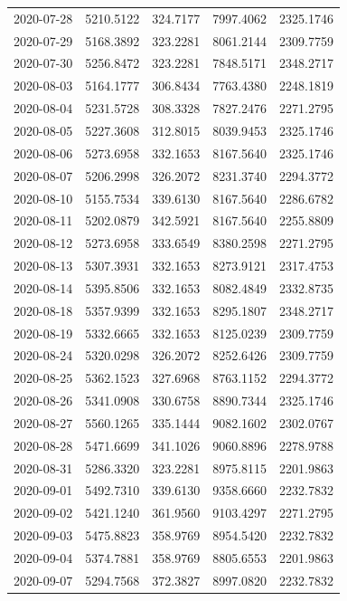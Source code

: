 \begin{footnotesize}
\begin{longtable}{lllll}
2020-07-28 & 5210.5122 & 324.7177 & 7997.4062 & 2325.1746 \\
2020-07-29 & 5168.3892 & 323.2281 & 8061.2144 & 2309.7759 \\
2020-07-30 & 5256.8472 & 323.2281 & 7848.5171 & 2348.2717 \\
2020-08-03 & 5164.1777 & 306.8434 & 7763.4380 & 2248.1819 \\
2020-08-04 & 5231.5728 & 308.3328 & 7827.2476 & 2271.2795 \\
2020-08-05 & 5227.3608 & 312.8015 & 8039.9453 & 2325.1746 \\
2020-08-06 & 5273.6958 & 332.1653 & 8167.5640 & 2325.1746 \\
2020-08-07 & 5206.2998 & 326.2072 & 8231.3740 & 2294.3772 \\
2020-08-10 & 5155.7534 & 339.6130 & 8167.5640 & 2286.6782 \\
2020-08-11 & 5202.0879 & 342.5921 & 8167.5640 & 2255.8809 \\
2020-08-12 & 5273.6958 & 333.6549 & 8380.2598 & 2271.2795 \\
2020-08-13 & 5307.3931 & 332.1653 & 8273.9121 & 2317.4753 \\
2020-08-14 & 5395.8506 & 332.1653 & 8082.4849 & 2332.8735 \\
2020-08-18 & 5357.9399 & 332.1653 & 8295.1807 & 2348.2717 \\
2020-08-19 & 5332.6665 & 332.1653 & 8125.0239 & 2309.7759 \\
2020-08-24 & 5320.0298 & 326.2072 & 8252.6426 & 2309.7759 \\
2020-08-25 & 5362.1523 & 327.6968 & 8763.1152 & 2294.3772 \\
2020-08-26 & 5341.0908 & 330.6758 & 8890.7344 & 2325.1746 \\
2020-08-27 & 5560.1265 & 335.1444 & 9082.1602 & 2302.0767 \\
2020-08-28 & 5471.6699 & 341.1026 & 9060.8896 & 2278.9788 \\
2020-08-31 & 5286.3320 & 323.2281 & 8975.8115 & 2201.9863 \\
2020-09-01 & 5492.7310 & 339.6130 & 9358.6660 & 2232.7832 \\
2020-09-02 & 5421.1240 & 361.9560 & 9103.4297 & 2271.2795 \\
2020-09-03 & 5475.8823 & 358.9769 & 8954.5420 & 2232.7832 \\
2020-09-04 & 5374.7881 & 358.9769 & 8805.6553 & 2201.9863 \\
2020-09-07 & 5294.7568 & 372.3827 & 8997.0820 & 2232.7832 \\

\end{longtable}
\end{footnotesize}
